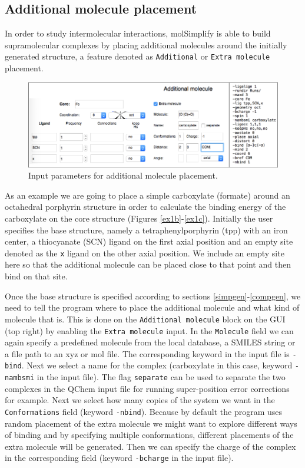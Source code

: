 \documentclass[a4paper,12pt]{assignment}
\begin{document}
\subsection{Additional molecule placement}

In order to study intermolecular interactions, molSimplify is able to build supramolecular complexes by placing additional molecules around the initially generated structure, a feature denoted as \texttt{Additional} or \texttt{Extra molecule} placement.

\begin{figure}[htb!]
\centering
\includegraphics[width=\textwidth]{./Figures/fig6.png}
\caption{Input parameters for additional molecule placement.}
\label{ex1a}
\end{figure}

As an example we are going to place a simple carboxylate (formate) around an octahedral porphyrin structure in order to calculate the binding energy of the carboxylate on the core structure (Figures \ref{ex1b}-\ref{ex1c}). Initially the user specifies the base structure, namely a tetraphenylporphyrin (tpp) with an iron center, a thiocyanate (SCN) ligand on the first axial position and an empty site denoted as the \texttt{x} ligand on the other axial position. We include an empty site here so that the additional molecule can be placed close to that point and then bind on that site.

Once the base structure is specified according to sections \ref{simpgen}-\ref{compgen}, we need to tell the program where to place the additional molecule and what kind of molecule that is. This is done on the \texttt{Additional molecule} block on the GUI (top right) by enabling the \texttt{Extra molecule} input. In the \texttt{Molecule} field we can again specify a predefined molecule from the local database, a SMILES string or a file path to an xyz or mol file. The corresponding keyword in the input file is \texttt{-bind}. Next we select a name for the complex (carboxylate in this case, keyword \texttt{-nambsmi} in the input file). The flag \texttt{separate} can be used to separate the two complexes in the QChem input file for running super-position error corrections for example. Next we select how many copies of the system we want in the \texttt{Conformations} field (keyword \texttt{-nbind}). Because by default the program uses random placement of the extra molecule we might want to explore different ways of binding and by specifying multiple conformations, different placements of the extra molecule will be generated. Then we can specify the charge of the complex in the corresponding field (keyword \texttt{-bcharge} in the input file). 
\end{document}
